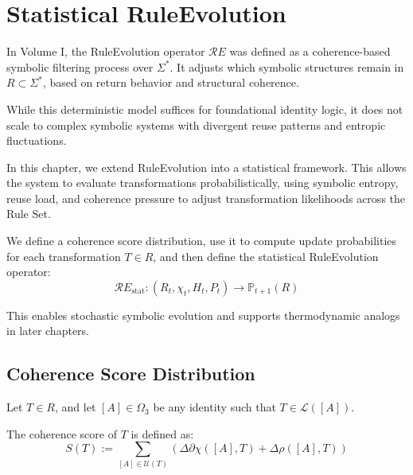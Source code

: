 \chapter{Statistical RuleEvolution} \label{chapter-3-statistical-ruleevolution}

In Volume I, the RuleEvolution operator $\mathcal{R}E$ was defined as a coherence-based symbolic filtering process over $\Sigma^*$. It adjusts which symbolic structures remain in $R \subset \Sigma^*$, based on return behavior and structural coherence.

While this deterministic model suffices for foundational identity logic, it does not scale to complex symbolic systems with divergent reuse patterns and entropic fluctuations.

\medskip

In this chapter, we extend RuleEvolution into a statistical framework. This allows the system to evaluate transformations probabilistically, using symbolic entropy, reuse load, and coherence pressure to adjust transformation likelihoods across the Rule Set.

\medskip

We define a coherence score distribution, use it to compute update probabilities for each transformation $T \in R$, and then define the statistical RuleEvolution operator:
\begin{equation} \label{eq:ruleevolution-stat}
\mathcal{R}E_{\text{stat}} : (R_t, \chi_t, H_t, P_t) \longrightarrow \mathbb{P}_{t+1}(R)
\end{equation}

This enables stochastic symbolic evolution and supports thermodynamic analogs in later chapters.

\section{Coherence Score Distribution} \label{coherence-score-distribution}

Let $T \in R$, and let $[A] \in \Omega_3$ be any identity such that $T \in \mathcal{L}([A])$.

\begin{definition} \label{def:coherence-score}
The coherence score of $T$ is defined as:
\begin{equation} \label{eq:coherence-score}
S(T) := \sum_{[A] \in \mathcal{U}(T)} \left( \Delta\partial\chi([A], T) + \Delta\rho([A], T) \right)
\end{equation}
\end{definition}

